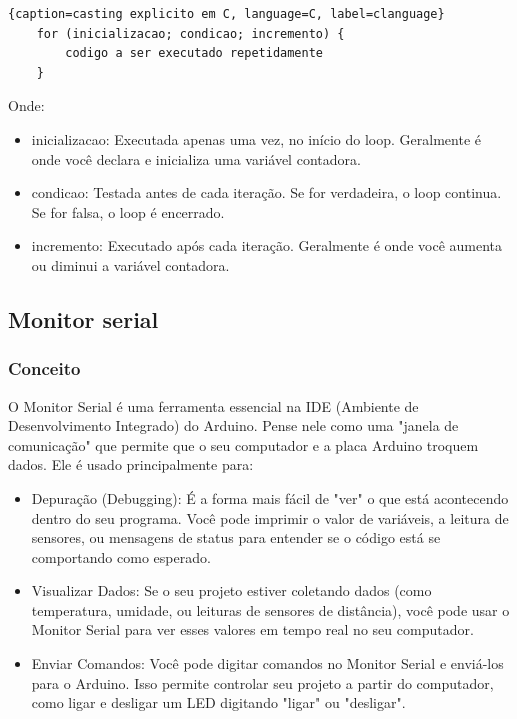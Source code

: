 \documentclass{report}
\begin{document}
	\begin{center}
		
		\begin{lstlisting}{caption=casting explicito em C, language=C, label=clanguage}	
	for (inicializacao; condicao; incremento) {
		codigo a ser executado repetidamente
	}
		\end{lstlisting}
	\end{center}
	Onde:
	
	\begin{itemize}
		\item inicializacao: Executada apenas uma vez, no início do loop. Geralmente é onde você declara e inicializa uma variável contadora.
		\item condicao: Testada antes de cada iteração. Se for verdadeira, o loop continua. Se for falsa, o loop é encerrado.
		\item incremento: Executado após cada iteração. Geralmente é onde você aumenta ou diminui a variável contadora.
	\end{itemize}
	
	\subsection{Monitor serial}
	\subsubsection{Conceito}
	O Monitor Serial é uma ferramenta essencial na IDE (Ambiente de Desenvolvimento Integrado) do Arduino. Pense nele como uma "janela de comunicação" que permite que o seu computador e a placa Arduino troquem dados. Ele é usado principalmente para:
	
	\begin{itemize}
		\item Depuração (Debugging): É a forma mais fácil de "ver" o que está acontecendo dentro do seu programa. Você pode imprimir o valor de variáveis, a leitura de sensores, ou mensagens de status para entender se o código está se comportando como esperado.
		\item Visualizar Dados: Se o seu projeto estiver coletando dados (como temperatura, umidade, ou leituras de sensores de distância), você pode usar o Monitor Serial para ver esses valores em tempo real no seu computador.
		\item Enviar Comandos: Você pode digitar comandos no Monitor Serial e enviá-los para o Arduino. Isso permite controlar seu projeto a partir do computador, como ligar e desligar um LED digitando "ligar" ou "desligar".
	\end{itemize}
	
\end{document}
